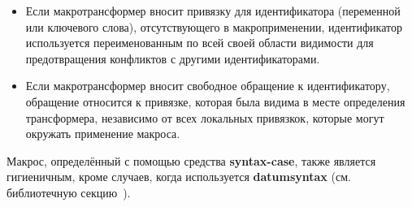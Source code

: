 \begin{itemize}
\item Если макротрансформер вносит привязку для идентификатора (переменной или ключевого
слова), отсутствующего в макроприменении, идентификатор используется переименованным
по всей своей области видимости для предотвращения конфликтов с другими идентификаторами.

\item Если макротрансформер вносит свободное обращение к идентификатору, обращение относится к
  привязке, которая была видима в месте определения трансформера, независимо от всех
  локальных привязкок, которые могут окружать применение макроса.
\end{itemize}

Макрос, определённый с помощью средства {\cf\bfseries syntax-case},
также является гигиеничным, кроме случаев, когда используется {\cf\bfseries
  datum\coerce{}syntax} (см. библиотечную секцию~).

